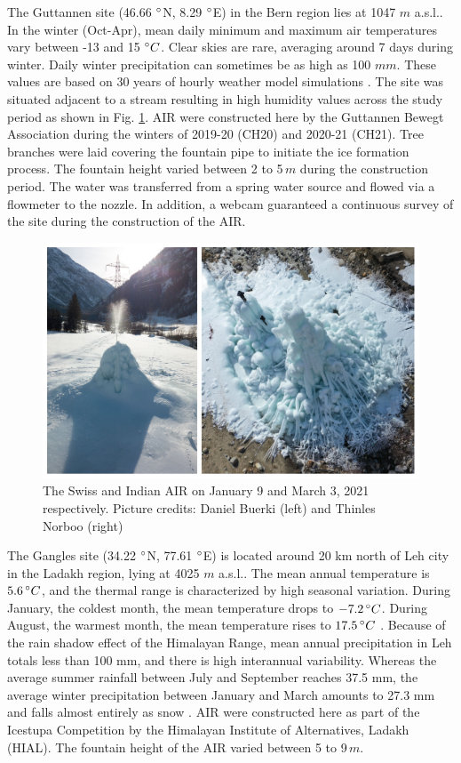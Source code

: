 \documentclass[utf8]{frontiersSCNS}
\begin{document}
The Guttannen site (46.66 $\degree$N, 8.29 $\degree$E) in the Bern region lies at 1047 $m$ a.s.l.. In the winter
(Oct-Apr), mean daily minimum and maximum air temperatures vary between -13 and 15 $\degree C$. Clear skies are
rare, averaging around 7 days during winter. Daily winter precipitation can sometimes be as high as 100 $mm$.
These values are based on 30 years of hourly weather model simulations \citep{guttannen}. The site was situated
adjacent to a stream resulting in high humidity values across the study period as shown in Fig. \ref{fig:2AIR}.
AIR were constructed here by the Guttannen Bewegt Association during the winters of 2019-20 (CH20) and 2020-21
(CH21). Tree branches were laid covering the fountain pipe to initiate the ice formation process. The fountain
height varied between 2 to 5\,$m$ during the construction period. The water was transferred from a spring water
source and flowed via a flowmeter to the nozzle. In addition, a webcam guaranteed a continuous survey of the
site during the construction of the AIR.

\begin{figure}
	\begin{center}
		\includegraphics[width=12 cm]{Figures/Figure_2.jpg}
	\end{center}
	\caption{The Swiss and Indian AIR on January 9 and March 3, 2021 respectively. Picture credits: Daniel Buerki (left)
		and Thinles Norboo (right)}
	\label{fig:2AIR}
\end{figure}

The Gangles site (34.22 $\degree$N, 77.61 $\degree$E) is located around 20 km north of Leh city in the Ladakh
region, lying at 4025 $m$ a.s.l.. The mean annual temperature is $5.6 \, \degree C$, and the thermal range is
characterized by high seasonal variation. During January, the coldest month, the mean temperature drops to $-7.2
\, \degree C$. During August, the warmest month, the mean temperature rises to $17.5 \, \degree C$
\citep{Nusser_2012}. Because of the rain shadow effect of the Himalayan Range, mean annual precipitation in Leh
totals less than 100 mm, and there is high interannual variability. Whereas the average summer rainfall between
July and September reaches 37.5 mm, the average winter precipitation between January and March amounts to 27.3
mm and falls almost entirely as snow .  AIR were constructed here as part of the Icestupa Competition  by the
Himalayan Institute of Alternatives, Ladakh (HIAL). The fountain height of the AIR varied between 5 to 9\,$m$.
\end{document}
